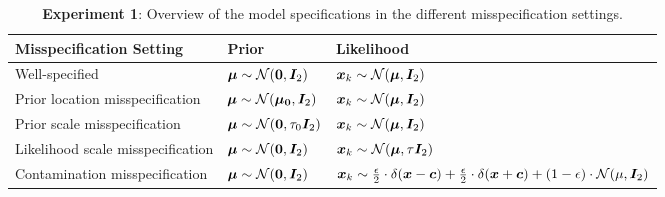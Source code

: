 \begin{table*}[h]
    \footnotesize
    \setlength\tabcolsep{1.5pt} %
    \centering
    \begin{tabular}{l|ll}
    \toprule
    \textbf{Misspecification Setting} & \textbf{Prior} & \textbf{Likelihood} \\ 
    \midrule
    Well-specified & $\boldsymbol{\mu} \sim \mathcal{N}(\boldsymbol{0}, {\bm{I}}_2)$ & $\boldsymbol{x}_k \sim \mathcal{N}(\boldsymbol{\mu}, {\bm{I}}_2)$ \\ 
    Prior location misspecification  & $\boldsymbol{\mu} \sim \mathcal{N}(\boldsymbol{\mu_0}, {\bm{I}}_2)$ & $\boldsymbol{x}_k \sim \mathcal{N}(\boldsymbol{\mu}, {\bm{I}}_2)$ \\ 
    Prior scale misspecification & $\boldsymbol{\mu} \sim \mathcal{N}(\boldsymbol{0}, \tau_0 {\bm{I}}_2)$ & $\boldsymbol{x}_k \sim \mathcal{N}(\boldsymbol{\mu}, {\bm{I}}_2)$ \\ 
    Likelihood scale misspecification & $\boldsymbol{\mu} \sim \mathcal{N}(\boldsymbol{0}, {\bm{I}}_2)$ & $\boldsymbol{x}_k \sim \mathcal{N}(\boldsymbol{\mu}, \tau {\bm{I}}_2)$ \\ 
    Contamination misspecification & $\boldsymbol{\mu} \sim \mathcal{N}(\boldsymbol{0}, {\bm{I}}_2)$ & $\boldsymbol{x}_k \sim \frac{\epsilon}{2} \cdot \delta(\boldsymbol{x} - \boldsymbol{c}) + \frac{\epsilon}{2} \cdot \delta(\boldsymbol{x} + \boldsymbol{c}) +  (1 - \epsilon) \cdot \mathcal{N}(\mu, {\bm{I}}_2)$ \\ 
    \bottomrule
    \end{tabular}
    \caption{\textbf{Experiment 1}: Overview of the model specifications in the different misspecification settings.}
    \label{tab:exp1_overview}
\end{table*}